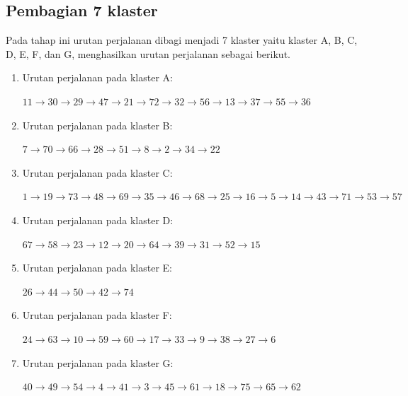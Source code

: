\subsection{Pembagian 7 klaster}

Pada tahap ini urutan perjalanan dibagi menjadi 7 klaster yaitu klaster A, B, C, D, E, F, dan G, menghasilkan urutan perjalanan sebagai berikut.

\begin{enumerate}

\item Urutan perjalanan pada klaster A:

$11\rightarrow30\rightarrow29\rightarrow47\rightarrow21\rightarrow72\rightarrow32\rightarrow56\rightarrow13\rightarrow37\rightarrow55\rightarrow36$

\item Urutan perjalanan pada klaster B:

$7\rightarrow70\rightarrow66\rightarrow28\rightarrow51\rightarrow8\rightarrow2\rightarrow34\rightarrow22$

\item Urutan perjalanan pada klaster C:

$1\rightarrow19\rightarrow73\rightarrow48\rightarrow69\rightarrow35\rightarrow46\rightarrow68\rightarrow25\rightarrow16\rightarrow5\rightarrow14\rightarrow43\rightarrow71\rightarrow53\rightarrow57$

\item Urutan perjalanan pada klaster D:

$67\rightarrow58\rightarrow23\rightarrow12\rightarrow20\rightarrow64\rightarrow39\rightarrow31\rightarrow52\rightarrow15$

\item Urutan perjalanan pada klaster E:

$26\rightarrow44\rightarrow50\rightarrow42\rightarrow74$

\item Urutan perjalanan pada klaster F:

$24\rightarrow63\rightarrow10\rightarrow59\rightarrow60\rightarrow17\rightarrow33\rightarrow9\rightarrow38\rightarrow27\rightarrow6$

\item Urutan perjalanan pada klaster G:

$40\rightarrow49\rightarrow54\rightarrow4\rightarrow41\rightarrow3\rightarrow45\rightarrow61\rightarrow18\rightarrow75\rightarrow65\rightarrow62$

\end{enumerate}

